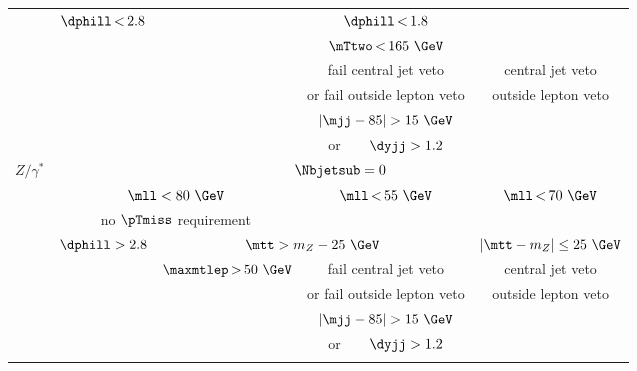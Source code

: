 \begin{tabular}{c|| c | c | c | c}
                           & $\dphill\,{<}\,2.8$                   &        &       $\dphill\,{<}\,1.8$      &    \\
                           &                                       &        &       $\mTtwo\,{<}\,165~\GeV$ &   \\ \cline{4-4}
                           & &           & fail central jet veto                                & central jet veto \\
                           & &           & or fail outside lepton veto                          & outside lepton veto  \\ \cline{4-4}
                           & &           & $|\mjj-85| > 15~\GeV$                               &    \\
                           & &          & or\ \ \ \ $\dyjj > 1.2$                                     &    \\
\hline\hline
\multirow{8}{*}{$Z/\gamma^{\ast}$}    &                        \multicolumn{4}{c}{\phantom{ccccc}$\Nbjetsub=0$}           \\ \cline{2-5}
                           & \multicolumn{2}{c|}{\phantom{ccccc}$\mll < 80~\GeV$} & $\mll\,{<}\,55~\GeV$ & $\mll\,{<}\,70~\GeV$    \\\
                           & \multicolumn{2}{c|}{no $\pTmiss$ requirement}  &  &   \\\cline{2-4}
                           & $\dphill > 2.8$        & \multicolumn{2}{c|}{$\mtt > m_Z - 25~\GeV$} &$|\mtt - m_Z| \leq 25~\GeV$  \\ \cline{3-4}
                           & &   $\maxmtlep\,{>}\,50~\GeV$       & fail central jet veto                                & central jet veto \\
                           & &           & or fail outside lepton veto                          & outside lepton veto  \\ \cline{4-4}
                           & &           & $|\mjj-85| > 15~\GeV$                               &    \\
                           & &           & or\ \ \ \ $\dyjj > 1.2$                                     &    \\
\dbline
\end{tabular}
